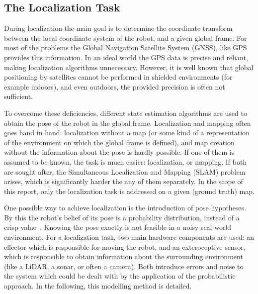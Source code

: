 \subsection{The Localization Task}

During localization the main goal is to determine the coordinate transform between the local coordinate system of the robot,
and a given global frame.
For most of the problems the Global Navigation Satellite System (GNSS), like GPS provides
this information. In an ideal world the GPS data is precise and reliant, making localization algorithms unnecessary.
However, it is well known that global positioning by satellites cannot be performed in shielded environments (for example indoors),
and even outdoors, the provided precision is often not sufficient.

To overcome these deficiencies, different state estimation algorithms are used to obtain the pose of the robot in the global frame.
Localization and mapping often goes hand in hand: localization without a map
(or some kind of a representation of the environment on which the global frame is defined),
and map creation without the information about the pose is hardly possible.
If one of them is assumed to be known, the task is much easier: localization, or mapping.
If both are sought after, the Simultaneous Localization and Mapping (SLAM) problem arises,
which is significantly harder the any of them separately.
In the scope of this report, only the localization task is addressed on a given (ground truth) map.

One possible way to achieve localization is the introduction of pose hypotheses.
By this the robot's belief of its pose is a probability distribution, instead of a crisp value~\cite{Thrun2005}.
Knowing the pose exactly is not feasible in a noisy real world environment.
For a localization task, two main hardware components are used: an effector which is responsible for moving the robot,
and an exteroceptive sensor, which is responsible to obtain information about the surrounding environment (like a LiDAR, a sonar, or often a camera).
Both introduce errors and noise to the system which could be dealt with by the application of the probabilistic approach.
In the following, this modelling method is detailed.

